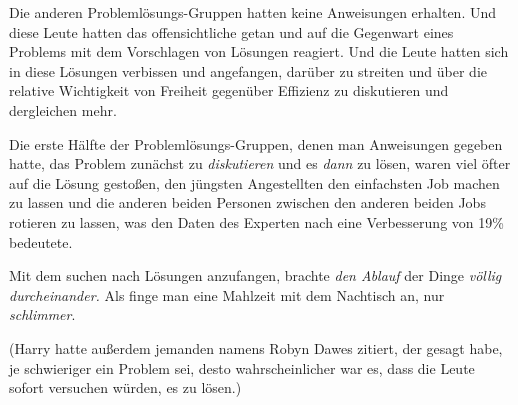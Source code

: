 Die anderen Problemlösungs-Gruppen hatten keine Anweisungen erhalten. Und diese Leute hatten das offensichtliche getan und auf die Gegenwart eines Problems mit dem Vorschlagen von Lösungen reagiert. Und die Leute hatten sich in diese Lösungen verbissen und angefangen, darüber zu streiten und über die relative Wichtigkeit von Freiheit gegenüber Effizienz zu diskutieren und dergleichen mehr.

Die erste Hälfte der Problemlösungs-Gruppen, denen man Anweisungen gegeben hatte, das Problem zunächst zu \emph{diskutieren} und es \emph{dann} zu lösen, waren viel öfter auf die Lösung gestoßen, den jüngsten Angestellten den einfachsten Job machen zu lassen und die anderen beiden Personen zwischen den anderen beiden Jobs rotieren zu lassen, was den Daten des Experten nach eine Verbesserung von 19\% bedeutete.

Mit dem suchen nach Lösungen anzufangen, brachte \emph{den Ablauf} der Dinge \emph{völlig durcheinander.} Als finge man eine Mahlzeit mit dem Nachtisch an, nur \emph{schlimmer}.

(Harry hatte außerdem jemanden namens Robyn Dawes zitiert, der gesagt habe, je schwieriger ein Problem sei, desto wahrscheinlicher war es, dass die Leute sofort versuchen würden, es zu lösen.)

